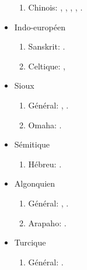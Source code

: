 \documentclass[oldfontcommands,oneside,a4paper,11pt]{article}
\newcommand{\langue}[2]{#2}
\begin{document}
\begin{itemize}
\begin{enumerate}
\item \langue{Chinese}{Chinois}:  \citet{jacques00ywij},  \citet{jacques03dissimilation}, \citet{jacques15sr},   \citet{jacques2015genetic}, \citet{jacques2015traditional}.
\end{enumerate}
\item \langue{Indo-European}{Indo-européen}
\begin{enumerate}
\item Sanskrit: \citet{jacques13vama}.
\item \langue{Celtic}{Celtique}: \citet{michaud-jacques12nasalite}, \citet{jacques15cochon}
\end{enumerate}
\item \langue{Siouan}{Sioux}
\begin{enumerate}
\item \langue{General}{Général}: \citet{jacques12bear},      \citet{michaud-jacques12nasalite}.  
\item Omaha: \citet{jacques16ebde}.
\end{enumerate}
\item \langue{Semitic}{Sémitique}
\begin{enumerate}
\item \langue{Hebrew}{Hébreu}: \citet{rg-gj12yod}.
\end{enumerate}
\item \langue{Algonquian}{Algonquien}
\begin{enumerate}
\item \langue{General}{Général}: \citet{jacques12bear}, \citet{jacques14inverse}.
\item Arapaho: \citet{jacques13arapaho}.
\end{enumerate}
\item  \langue{Turkic}{Turcique}
\begin{enumerate}
\item  \langue{General}{Général}: \citet{antonov12kumush}.
\end{enumerate}
\end{itemize} 
 
\end{document}
